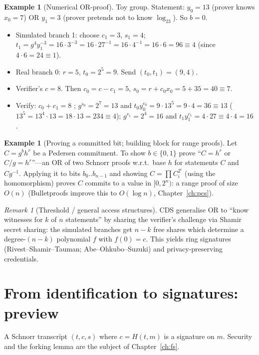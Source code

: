 \documentclass[11pt,a4paper]{report}
\theoremstyle{plain}
\theoremstyle{definition}
\newtheorem{example}[theorem]{Example}
\theoremstyle{remark}
\newtheorem{remark}[theorem]{Remark}
\newcommand{\inv}{^{-1}}
\begin{document}
\begin{example}[Numerical OR-proof]
Toy group. Statement: $y_0=13$ (prover knows $x_0=7$) OR $y_1=3$ (prover pretends not to know $\log_23$). So $b=0$.
\begin{itemize}
\item Simulated branch 1: choose $c_1=3$, $s_1=4$; $t_1=g^4y_1^{-3}=16\cdot3^{-3}=16\cdot27\inv=16\cdot4\inv=16\cdot6=96\equiv4$ (since $4\cdot6=24\equiv1$).
\item Real branch 0: $r=5$, $t_0=2^5=9$. Send $(t_0,t_1)=(9,4)$.
\item Verifier's $c=8$. Then $c_0=c-c_1=5$, $s_0=r+c_0x_0=5+35=40\equiv7$.
\item Verify: $c_0+c_1=8$ \checkmark; $g^{s_0}=2^7=13$ and $t_0y_0^{c_0}=9\cdot13^5=9\cdot4=36\equiv13$ \checkmark ($13^5=13^4\cdot13=18\cdot13=234\equiv4$); $g^{s_1}=2^4=16$ and $t_1y_1^{c_1}=4\cdot27\equiv4\cdot4=16$ \checkmark.
\end{itemize}
\end{example}
\begin{example}[Proving a committed bit; building block for range proofs]
Let $C=g^bh^r$ be a Pedersen commitment. To show $b\in\{0,1\}$ prove ``$C=h^r$ or $C/g=h^r$''---an OR of two Schnorr proofs w.r.t.\ base $h$ for statements $C$ and $Cg^{-1}$. Applying it to bits $b_0..b_{n-1}$ and showing $C=\prod C_i^{2^i}$ (using the homomorphism) proves $C$ commits to a value in $[0,2^n)$: a range proof of size $O(n)$ (Bulletproofs improve this to $O(\log n)$, Chapter~\ref{ch:pcs}).
\end{example}
\begin{remark}[Threshold / general access structures]
CDS generalise OR to ``know witnesses for $k$ of $n$ statements'' by sharing the verifier's challenge via Shamir secret sharing: the simulated branches get $n-k$ free shares which determine a degree-$(n-k)$ polynomial $f$ with $f(0)=c$. This yields ring signatures (Rivest--Shamir--Tauman; Abe--Ohkubo--Suzuki) and privacy-preserving credentials.
\end{remark}

\section{From identification to signatures: preview}
A Schnorr transcript $(t,c,s)$ where $c=H(t,m)$ is a signature on $m$. Security and the forking lemma are the subject of Chapter~\ref{ch:fs}.
\end{document}
